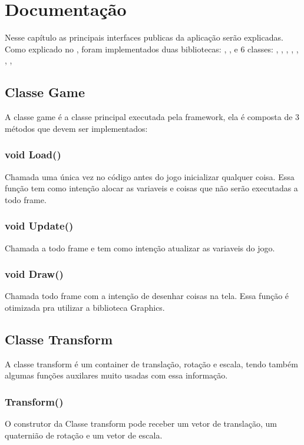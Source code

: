 \chapter{Documentação}
\label{cap:Documentação}

Nesse capítulo as principais interfaces publicas da aplicação serão explicadas. Como explicado no , foram implementados duas bibliotecas: , , e 6 classes: , , , , , , ,

\section{Classe Game}
\label{doc:game}

A classe game é a classe principal executada pela framework, ela é composta de 3 métodos que devem ser implementados: 

\subsection{void Load()}
Chamada uma única vez no código antes do jogo inicializar qualquer coisa. Essa função tem como intenção alocar as variaveis e coisas que não serão executadas a todo frame.

\subsection{void Update()}
Chamada a todo frame e tem como intenção atualizar as variaveis do jogo.
 
\subsection{void Draw()}
Chamada todo frame com a intenção de desenhar coisas na tela. Essa função é otimizada pra utilizar a biblioteca Graphics.

\section{Classe Transform}
\label{doc:transform}

A classe transform é um container de translação, rotação e escala, tendo também algumas funções auxilares muito usadas com essa informação.

\subsection{Transform()}
O construtor da Classe transform pode receber um vetor de translação, um quaternião de rotação e um vetor de escala.

